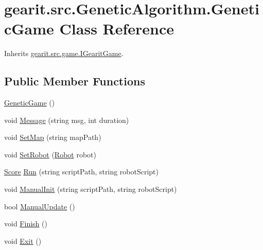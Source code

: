 \hypertarget{classgearit_1_1src_1_1_genetic_algorithm_1_1_genetic_game}{\section{gearit.\+src.\+Genetic\+Algorithm.\+Genetic\+Game Class Reference}
\label{classgearit_1_1src_1_1_genetic_algorithm_1_1_genetic_game}
}


Inherits \hyperlink{interfacegearit_1_1src_1_1game_1_1_i_gearit_game}{gearit.\+src.\+game.\+I\+Gearit\+Game}.

\subsection*{Public Member Functions}
\begin{DoxyCompactItemize}
\item 
\hyperlink{classgearit_1_1src_1_1_genetic_algorithm_1_1_genetic_game_a8a2fcc3deb32e228fb66b7ae8fcc5727}{Genetic\+Game} ()
\item 
void \hyperlink{classgearit_1_1src_1_1_genetic_algorithm_1_1_genetic_game_a77b40aa7fd214187155ea6bee43569b2}{Message} (string msg, int duration)
\item 
void \hyperlink{classgearit_1_1src_1_1_genetic_algorithm_1_1_genetic_game_ab6f04dc5b0ecd581be76200258e4298a}{Set\+Map} (string map\+Path)
\item 
void \hyperlink{classgearit_1_1src_1_1_genetic_algorithm_1_1_genetic_game_a8f3d8cd92b4ee5b9a69e264bf9b235ff}{Set\+Robot} (\hyperlink{classgearit_1_1src_1_1robot_1_1_robot}{Robot} robot)
\item 
\hyperlink{classgearit_1_1src_1_1game_1_1_score}{Score} \hyperlink{classgearit_1_1src_1_1_genetic_algorithm_1_1_genetic_game_a51698e5b87e8399d03606703207be3f2}{Run} (string script\+Path, string robot\+Script)
\item 
void \hyperlink{classgearit_1_1src_1_1_genetic_algorithm_1_1_genetic_game_a08ee98f1b1b0082b7593d5b169cd7d02}{Manual\+Init} (string script\+Path, string robot\+Script)
\item 
bool \hyperlink{classgearit_1_1src_1_1_genetic_algorithm_1_1_genetic_game_acaa2c454d202899a485622ef0e75aff2}{Manual\+Update} ()
\item 
void \hyperlink{classgearit_1_1src_1_1_genetic_algorithm_1_1_genetic_game_a0355e93614ed1ddc5a5a14b9fb992dcf}{Finish} ()
\item 
void \hyperlink{classgearit_1_1src_1_1_genetic_algorithm_1_1_genetic_game_a38c3773228d3a024d96e8dd7cf9cbc93}{Exit} ()
\end{DoxyCompactItemize}
